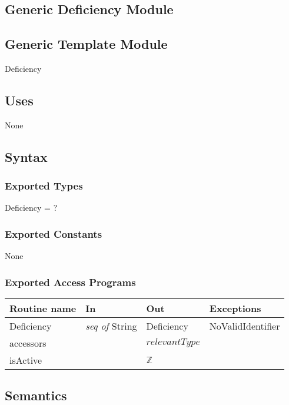 \documentclass[12pt]{article}
\begin{document}
\newpage

\subsection{Generic Deficiency Module}

\subsection* {Generic Template Module}

Deficiency

\subsection* {Uses}

None

\subsection* {Syntax}

\subsubsection* {Exported Types}

Deficiency = ?

\subsubsection* {Exported Constants}

None

\subsubsection* {Exported Access Programs}

\begin{tabular}{| l | l | l | p{6cm} |}
\hline
\textbf{Routine name} & \textbf{In} & \textbf{Out} & \textbf{Exceptions}\\
\hline
Deficiency & \textit{seq of} String & Deficiency & NoValidIdentifier\\
\hline
accessors & ~ & $relevant Type$ & ~\\
\hline
isActive & ~ & $\mathbb{Z}$ & ~\\
\hline
\end{tabular}

\subsection* {Semantics}
\end{document}
